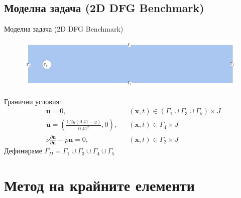 \documentclass{beamer}
\newcommand{\vecf}[1]{\textbf{#1}}
\begin{document}
\subsection{Моделна задача (2D DFG Benchmark)}
\begin{frame}{Моделна задача (2D DFG Benchmark)}
\begin{figure}[H]
  \centering
  \includegraphics[width=\textwidth]{../Figures/02_model_problem/2D_DFG_Benchmark.pdf}
\end{figure}
Гранични условия:
\begin{align*}
  &\vecf{u} = 0, &&\left(\vecf{x}, t\right) \in \left(\Gamma_1 \cup \Gamma_3 \cup \Gamma_5\right) \times J \\
  &\vecf{u} = \left(\frac{1.2y\left(0.41 - y\right)}{0.41^2}, 0\right), &&\left(\vecf{x}, t\right) \in \Gamma_4 \times J \\
  &\nu\frac{\partial\vecf{u}}{\partial\vecf{n}} - p\vecf{n} = 0, &&\left(\vecf{x}, t\right) \in \Gamma_2 \times J
\end{align*}
Дефинираме $\Gamma_D = \Gamma_1 \cup \Gamma_3 \cup \Gamma_4 \cup \Gamma_5$
\end{frame}

\section{Метод на крайните елементи}





\iffalse
\end{document}

